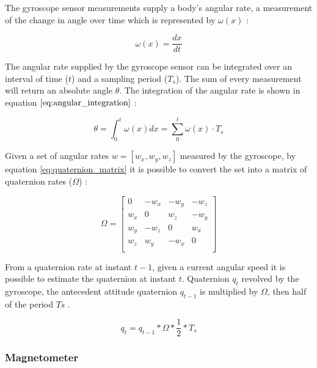 The gyroscope sensor measurements supply a body's angular rate, a measurement of the change in angle over time which is represented by $\omega(x)$ \cite{trusov2011overview}:

\begin{equation}
  \omega(x) = \frac{dx}{dt}
\end{equation}

The angular rate supplied by the gyroscope sensor can be integrated over an interval of time ($t$) and a sampling period ($T_s$). The sum of every measurement will return an absolute angle $\theta$. The integration of the angular rate is shown in equation $\ref{eq:angular_integration}$ \cite{trusov2011overview}:

\begin{equation}
  \theta = \int_{0}^{t} \omega(x) dx = \sum_{0}^{t} \omega(x)\cdot T_s
  \label{eq:angular_integration}
\end{equation}

Given a set of angular rates $w=[w_x,w_y,w_z]$ measured by the gyroscope, by equation \ref{eq:quaternion_matrix} it is possible to convert the set into a matrix of quaternion rates ($\Omega$) \cite{trusov2011overview}:

\begin{equation}
  \Omega = \begin{bmatrix}
    0   & -w_x & -w_y & -w_z \\
    w_x & 0    & w_z  & -w_y \\
    w_y & -w_z & 0    & w_x  \\
    w_z & w_y  & -w_x & 0    \\
  \end{bmatrix}
\end{equation}

From a quaternion rate at instant $t-1$, given a current angular speed it is possible to estimate the quaternion at instant $t$. Quaternion $q_t$ revolved by the gyroscope, the antecedent attitude quaternion $q_{t-1}$ is multiplied by $\Omega$, then half of the period $Ts$ \cite{trusov2011overview}.

\begin{equation}
  q_t = q_{t-1} \ast \Omega \ast \frac{1}{2} \ast T_s
\end{equation}

\subsubsection{Magnetometer}

